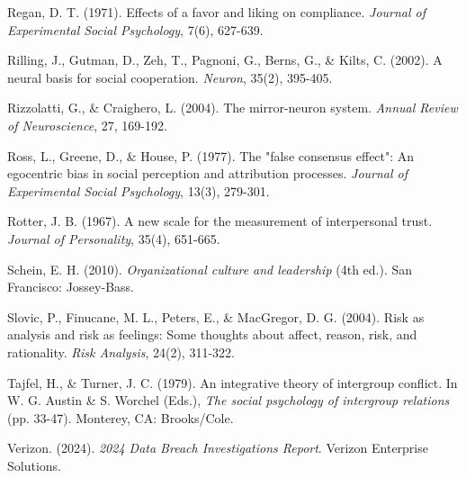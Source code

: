 \documentclass[11pt,a4paper]{article}
\begin{document}
\begin{thebibliography}{99}
Regan, D. T. (1971). Effects of a favor and liking on compliance. \textit{Journal of Experimental Social Psychology}, 7(6), 627-639.

Rilling, J., Gutman, D., Zeh, T., Pagnoni, G., Berns, G., \& Kilts, C. (2002). A neural basis for social cooperation. \textit{Neuron}, 35(2), 395-405.

Rizzolatti, G., \& Craighero, L. (2004). The mirror-neuron system. \textit{Annual Review of Neuroscience}, 27, 169-192.

Ross, L., Greene, D., \& House, P. (1977). The "false consensus effect": An egocentric bias in social perception and attribution processes. \textit{Journal of Experimental Social Psychology}, 13(3), 279-301.

Rotter, J. B. (1967). A new scale for the measurement of interpersonal trust. \textit{Journal of Personality}, 35(4), 651-665.

Schein, E. H. (2010). \textit{Organizational culture and leadership} (4th ed.). San Francisco: Jossey-Bass.

Slovic, P., Finucane, M. L., Peters, E., \& MacGregor, D. G. (2004). Risk as analysis and risk as feelings: Some thoughts about affect, reason, risk, and rationality. \textit{Risk Analysis}, 24(2), 311-322.

Tajfel, H., \& Turner, J. C. (1979). An integrative theory of intergroup conflict. In W. G. Austin \& S. Worchel (Eds.), \textit{The social psychology of intergroup relations} (pp. 33-47). Monterey, CA: Brooks/Cole.

Verizon. (2024). \textit{2024 Data Breach Investigations Report}. Verizon Enterprise Solutions.

\end{thebibliography}
\end{document}
